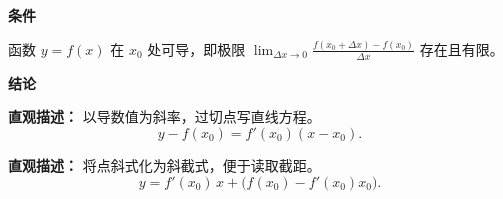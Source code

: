 \begin{statementbox}
	\textbf{\textcolor{CStatement}{条件}}
	\begin{description}[style=nextline, leftmargin=2.8em, labelsep=0.5em, itemsep=0.35em]
		\item[\textbf{\textcolor{CStatement}{条件 1（可导条件）：}}]
			函数 $y = f(x)$ 在 $x_0$ 处可导，即极限 $\lim_{\Delta x \to 0} \frac{f(x_0 + \Delta x) - f(x_0)}{\Delta x}$ 存在且有限。
	\end{description}
	\textbf{\textcolor{CStatement}{结论}}
	\begin{description}[style=nextline, leftmargin=2.8em, labelsep=0.5em, itemsep=0.45em]
		\item[\textbf{\textcolor{CStatement}{结论一（切线点斜式）：}}]
			\textbf{\textcolor{CStatement}{直观描述：}}
			以导数值为斜率，过切点写直线方程。
			\[
				\boxed{y - f(x_0) = f'(x_0)(x - x_0)}.
			\]
		\item[\textbf{\textcolor{CStatement}{常见变形（斜截形式）：}}]
			\textbf{\textcolor{CStatement}{直观描述：}}
			将点斜式化为斜截式，便于读取截距。
			\[
				\boxed{y = f'(x_0)\,x + \bigl(f(x_0) - f'(x_0)x_0\bigr)}.
			\]
	\end{description}

\end{statementbox}
